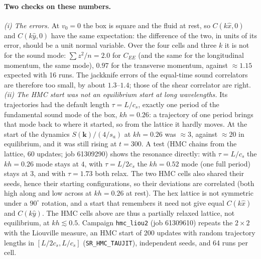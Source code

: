 \documentclass[11pt,aps,preprint,nofootinbib,superscriptaddress,tightenlines]{revtex4-2}
\let\oldparagraph\paragraph
\renewcommand{\paragraph}{\par\bigskip\oldparagraph}
\begin{document}
\paragraph{Two checks on these numbers.}  \emph{(i) The errors.}  At $v_0=0$ the box is square and the fluid at rest, so $C(k\hat x,0)$ and
$C(k\hat y,0)$ have the same expectation: the difference of the two, in units of its error, should be a unit normal variable.  Over the
four cells and three $k$ it is not for the sound mode: $\sum z^2/n=2.0$ for $C_{EE}$ (and the same for the longitudinal momentum, the same
mode), $0.97$ for the transverse momentum, against $\approx1.15$ expected with 16 runs.  The jackknife errors of the equal-time sound
correlators are therefore too small, by about $1.3$--$1.4$; those of the shear correlator are right.
\emph{(ii) The HMC start was not an equilibrium start at long wavelengths.}  Its trajectories had the default length $\tau=L/c_s$, exactly
one period of the fundamental sound mode of the box, $kh=0.26$: a trajectory of one period brings that mode back to where it started, so
from the lattice it hardly moves.  At the start of the dynamics $S(\bm k)/(4/s_a)$ at $kh=0.26$ was $\approx3$, against $\approx20$ in
equilibrium, and it was still rising at $t=300$.  A test (HMC chains from the lattice, 60 updates; job 61309290) shows the resonance
directly: with $\tau=L/c_s$ the $kh=0.26$ mode stays at $4$, with $\tau=L/2c_s$ the $kh=0.52$ mode (one full period) stays at $3$, and with
$\tau=1.73$ both relax.  The two HMC cells also shared their seeds, hence their starting configurations, so their deviations are
correlated (both high along and low across at $kh=0.26$ at rest).  The hex lattice is not symmetric under a $90^\circ$ rotation, and a
start that remembers it need not give equal $C(k\hat x)$ and $C(k\hat y)$.  The HMC cells above are thus a partially relaxed lattice,
not equilibrium, at $kh\lesssim0.5$.  Campaign \texttt{hmc\_liou2} (job 61309610) repeats the $2\times2$ with the Liouville measure, an HMC start of
200 updates with random trajectory lengths in $[L/2c_s,L/c_s]$ (\texttt{SR\_HMC\_TAUJIT}), independent seeds, and 64 runs per cell.
\end{document}
